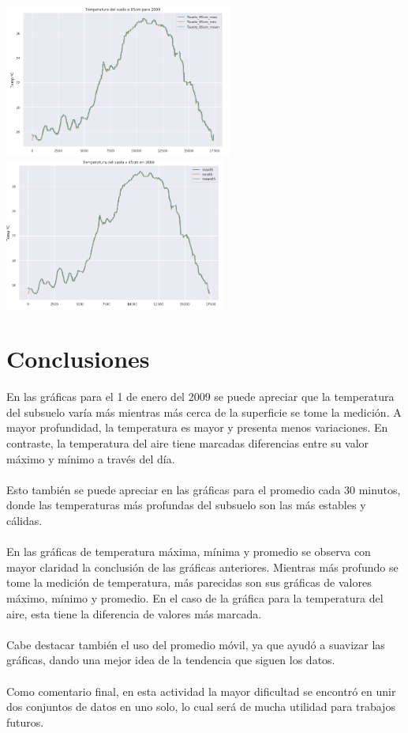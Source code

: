 \documentclass[letterpaper,12pt]{article}
\begin{document}
\begin{center}
	\includegraphics[height=5cm]{T85.png}\hspace*{\fill}
	\label{graf11}
   \includegraphics[height=5cm]{T85roll.png}
    \label{graf12}
\end{center}

\section{Conclusiones}

En las gráficas para el 1 de enero del 2009 se puede apreciar que la temperatura del subsuelo varía más mientras más cerca de la superficie se tome la medición. A mayor profundidad, la temperatura es mayor y presenta menos variaciones. En contraste, la temperatura del aire tiene marcadas diferencias entre su valor máximo y mínimo a través del día. 
\\
\\
Esto también se puede apreciar en las gráficas para el promedio cada 30 minutos, donde las temperaturas más profundas del subsuelo son las más estables y cálidas.
\\
\\
En las gráficas de temperatura máxima, mínima y promedio se observa con mayor claridad la conclusión de las gráficas anteriores. Mientras más profundo se tome la medición de temperatura, más parecidas son sus gráficas de valores máximo, mínimo y promedio. En el caso de la gráfica para la temperatura del aire, esta tiene la diferencia de valores más marcada. 
\\
\\
Cabe destacar también el uso del promedio móvil, ya que ayudó a suavizar las gráficas, dando una mejor idea de la tendencia que siguen los datos.
\\
\\
Como comentario final, en esta actividad la mayor dificultad se encontró en unir dos conjuntos de datos en uno solo, lo cual será de mucha utilidad para trabajos futuros.    
\end{document}
